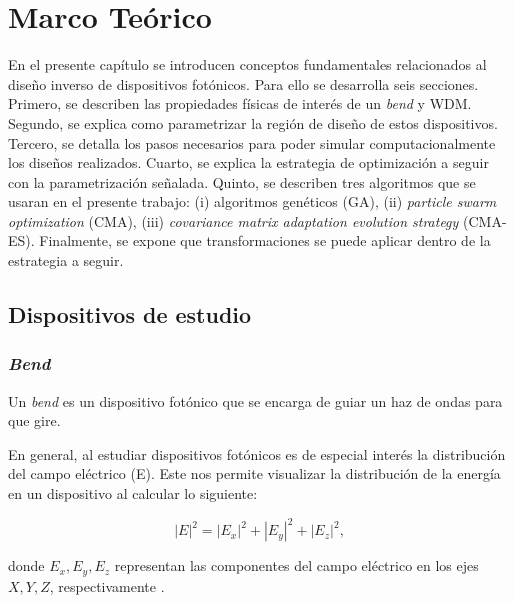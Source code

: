 \chapter{Marco  Teórico}

En el presente capítulo se introducen conceptos fundamentales relacionados al diseño inverso de dispositivos fotónicos.
Para ello se desarrolla seis secciones. 
Primero, se describen las propiedades físicas de interés de un \emph{bend} y WDM.
Segundo, se explica como parametrizar la región de diseño de estos
dispositivos.
Tercero, se detalla los pasos necesarios para poder simular computacionalmente
los diseños realizados.
Cuarto, se explica la estrategia de optimización a seguir con la
parametrización señalada.
Quinto, se describen tres algoritmos que se usaran en el presente trabajo: (i)
algoritmos genéticos (GA), (ii) \emph{particle swarm optimization} (CMA), (iii)
\emph{covariance matrix adaptation evolution strategy} (CMA-ES).
Finalmente, se expone que transformaciones se puede aplicar dentro de la
estrategia a seguir.


\section{Dispositivos de estudio}

\subsection{\emph{Bend}}

Un \emph{bend} es un dispositivo fotónico que se encarga de guiar un haz de ondas para que gire.

En general, al estudiar dispositivos fotónicos es de especial interés la
distribución del campo eléctrico (E).
Este nos permite visualizar la distribución de la energía en un dispositivo al calcular lo siguiente:

\begin{equation}
  |E|^2 = |E_x|^2+|E_y|^2+|E_z|^2,
\label{eq:field}
\end{equation}

donde $E_x, E_y, E_z$ representan las componentes del campo eléctrico en los ejes $X, Y, Z$, respectivamente
\citep{LukasChrostowski2010}.


